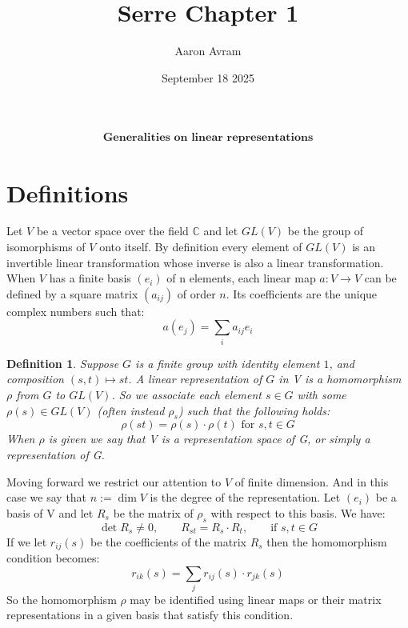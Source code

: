 \documentclass[12pt]{article}
\title{Serre Chapter 1}
\author{Aaron Avram}
\date{September 18 2025}
\begin{document}
\newtheorem{definition}{Definition}
\newtheorem{theorem}{Theorem}

\maketitle

\begin{align*}
    \textbf{Generalities on linear representations}
\end{align*}

\section{Definitions}

Let $V$ be a vector space over the field $\mathbb C$ and let $GL(V)$ be the group
of isomorphisms of $V$ onto itself. By definition every element of $GL(V)$ is an invertible
linear transformation whose inverse is also a linear transformation. When $V$
has a finite basis $(e_i)$ of n elements, each linear map $a: V \to V$
can be defined by a square matrix $(a_{ij})$ of order $n$. Its coefficients are the
unique complex numbers such that:
\[ a(e_j) = \sum_{i} a_{ij}e_i \] 

\begin{definition}
    Suppose $G$ is a finite group with identity element $1$, and composition $(s, t) \mapsto st$.
    A linear representation of $G$ in V is a homomorphism $\rho$ from $G$ to $GL(V)$. So we associate
    each element $s \in G$ with some $\rho(s) \in GL(V)$ (often instead $\rho_s$) such that the following holds:
    \[ \rho(st) = \rho(s) \cdot \rho(t) \text{ for } s, t \in G \]
    When $\rho$ is given we say that V is a representation space of G, or simply a representation of G.
\end{definition}
Moving forward we restrict our attention to $V$ of finite dimension. And in this case
we say that $n := \dim V$ is the degree of the representation. Let $(e_i)$ be a basis of V
and let $R_s$ be the matrix of $\rho_s$ with respect to this basis. We have:
\[ \det R_s \neq 0, \qquad R_{st} = R_s \cdot R_t, \qquad \text{if $s, t \in G$}\]
If we let $r_{ij}(s)$ be the coefficients of the matrix $R_s$ then the homomorphism condition becomes:
\[ r_{ik}(s) = \sum_{j} r_{ij}(s) \cdot r_{jk}(s) \]
So the homomorphism $\rho$ may be identified using linear maps or their matrix representations
in a given basis that satisfy this condition.
\end{document}
